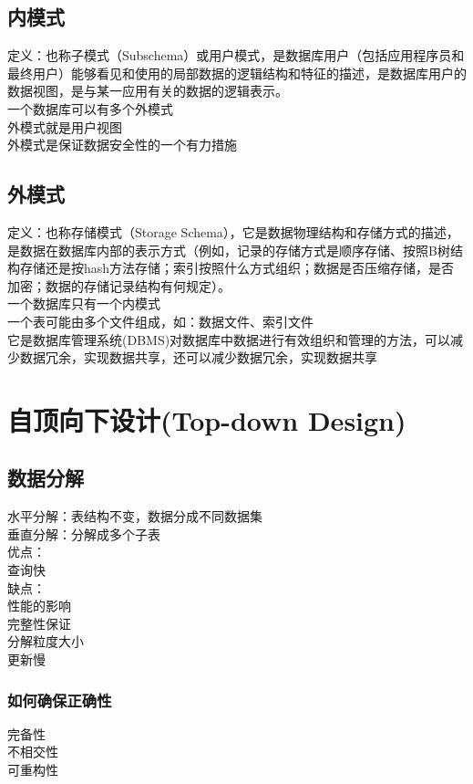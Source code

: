 \documentclass{article}
\begin{document}
\begin{CJK}{UTF8}{gbsn}
	\subsection*{内模式}
	定义：也称子模式（Subschema）或用户模式，是数据库用户（包括应用程序员和最终用户）能够看见和使用的局部数据的逻辑结构和特征的描述，是数据库用户的数据视图，是与某一应用有关的数据的逻辑表示。\\
	一个数据库可以有多个外模式\\
	外模式就是用户视图\\
	外模式是保证数据安全性的一个有力措施\\
	\subsection*{外模式}
	定义：也称存储模式（Storage Schema），它是数据物理结构和存储方式的描述，是数据在数据库内部的表示方式（例如，记录的存储方式是顺序存储、按照B树结构存储还是按hash方法存储；索引按照什么方式组织；数据是否压缩存储，是否加密；数据的存储记录结构有何规定）。\\
	一个数据库只有一个内模式\\
	一个表可能由多个文件组成，如：数据文件、索引文件\\
	它是数据库管理系统(DBMS)对数据库中数据进行有效组织和管理的方法，可以减少数据冗余，实现数据共享，还可以减少数据冗余，实现数据共享\\
	\section*{自顶向下设计(Top-down Design)}
	\subsection*{数据分解}
	水平分解：表结构不变，数据分成不同数据集\\
	垂直分解：分解成多个子表\\
	优点：\\
	查询快\\
	缺点：\\
	性能的影响\\
	完整性保证\\
	分解粒度大小\\
	更新慢\\
	\subsubsection*{如何确保正确性}
	完备性\\
	不相交性\\
	可重构性\\
	

\end{CJK}
\end{document}

